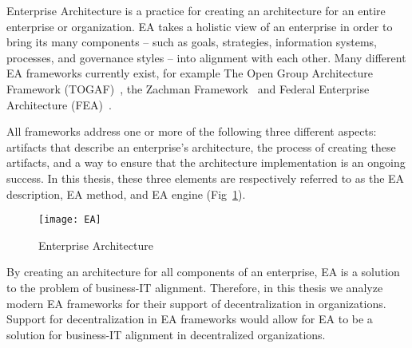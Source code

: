 Enterprise Architecture is a practice for creating an architecture for an entire enterprise or organization. EA takes a holistic view of an enterprise in order to bring its many components -- such as goals, strategies, information systems, processes, and governance styles -- into alignment with each other. Many different EA frameworks currently exist, for example The Open Group Architecture Framework (TOGAF)~\cite{togaf9.1}, the Zachman Framework~\cite{zachman} and Federal Enterprise Architecture (FEA)~\cite{FEA_PMO2007}. 

All frameworks address one or more of the following three different aspects: artifacts that describe an enterprise's architecture, the process of creating these artifacts, and a way to ensure that the architecture implementation is an ongoing success. In this thesis, these three elements are respectively referred to as the EA description, EA method, and EA engine (Fig~\ref{fig:EA_general}). 

\begin{figure}
\texttt{[image: EA]}
\caption{Enterprise Architecture}
\label{fig:EA_general}
\end{figure}

By creating an architecture for all components of an enterprise, EA is a solution to the problem of business-IT alignment. Therefore, in this thesis we analyze modern EA frameworks for their support of decentralization in organizations. Support for decentralization in EA frameworks would allow for EA to be a solution for business-IT alignment in decentralized organizations. 



